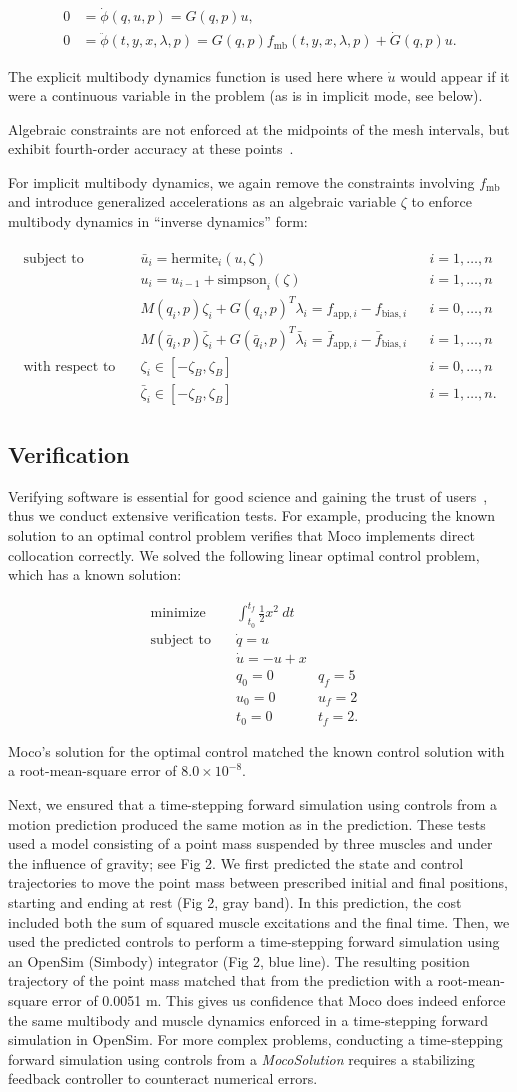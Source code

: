 \documentclass[10pt,letterpaper]{article}
\newcommand{\hermitesimpsonkincon}{
    \begin{align}
         0 &= \dot{\phi}(q, u, p) = G(q, p) u,\\
         0 &= \ddot{\phi}(t, y, x, \lambda, p) = G(q, p) f_{\textrm{mb}}(t, y, x, \lambda, p) + \dot{G}(q, p) u.
    \end{align}
}
\newcommand{\hermitesimpsonimplicit}{
\begin{align}
    \begin{aligned}
    \mbox{subject to} \quad
         & \bar{u}_i = \textrm{hermite}_i(u, \zeta) && i = 1, \ldots, n \\
         & u_i = u_{i-1} + \textrm{simpson}_i(\zeta)  && i = 1, \ldots, n \\
         & M(q_i, p)\zeta_i + G(q_i, p)^T \lambda_i =
          f_{\textrm{app},i} -
            f_{\textrm{bias},i} && i = 0, \ldots, n \\
         & M(\bar{q}_i, p)\bar{\zeta}_i + G(\bar{q}_i, p)^T \bar{\lambda}_i =
          \bar{f}_{\textrm{app},i} -
            \bar{f}_{\textrm{bias},i} && i = 1, \ldots, n \\
    \mbox{with respect to} \quad
         & \zeta_i \in [-\zeta_{B}, \zeta_{B}] && i = 0, \ldots, n \\
         & \bar{\zeta}_i \in [-\zeta_{B}, \zeta_{B}] && i = 1, \ldots, n.
    \end{aligned}
\end{align}
}
\newcommand{\analytic}{
\begin{equation}
    \begin{aligned}
        \mbox{minimize}
         \quad & \int_{t_0}^{t_f} \frac{1}{2}x^2~dt &&  \\
         \mbox{subject to}
         \quad & \dot{q} = u \\
         & \dot{u} = -u + x \\
         & q_0 = 0 & q_f = 5 \\
         & u_0 = 0 & u_f = 2\\
         & t_0 = 0 & t_f = 2.
    \end{aligned}
\end{equation}
}
\begin{document}
\hermitesimpsonkincon

The explicit multibody dynamics function is used here where $ \dot{u} $ would appear if it were a continuous variable in the problem (as is in implicit mode, see below).

Algebraic constraints are not enforced at the midpoints of the mesh intervals, but exhibit fourth-order accuracy at these points~\cite{Posa:2016}.

For implicit multibody dynamics, we again remove the constraints involving $f_\mathrm{mb}$ and introduce generalized accelerations as an algebraic variable $\zeta$ to enforce multibody dynamics in “inverse dynamics” form:

\hermitesimpsonimplicit

\subsection*{Verification}

Verifying software is essential for good science and gaining the trust of users~\cite{Hicks:2015bo}, thus we conduct extensive verification tests. For example, producing the known solution to an optimal control problem verifies that Moco implements direct collocation correctly. We solved the following linear optimal control problem, which has a known solution:

\analytic

Moco’s solution for the optimal control matched the known control solution with a root-mean-square error of $8.0 \times 10^{-8}$.

Next, we ensured that a time-stepping forward simulation using controls from a motion prediction produced the same motion as in the prediction. These tests used a model consisting of a point mass suspended by three muscles and under the influence of gravity; see Fig 2. We first predicted the state and control trajectories to move the point mass between prescribed initial and final positions, starting and ending at rest (Fig 2, gray band). In this prediction, the cost included both the sum of squared muscle excitations and the final time. Then, we used the predicted controls to perform a time-stepping forward simulation using an OpenSim (Simbody) integrator (Fig 2, blue line). The resulting position trajectory of the point mass matched that from the prediction with a root-mean-square error of 0.0051 m. This gives us confidence that Moco does indeed enforce the same multibody and muscle dynamics enforced in a time-stepping forward simulation in OpenSim. For more complex problems, conducting a time-stepping forward simulation using controls from a \textit{MocoSolution} requires a stabilizing feedback controller to counteract numerical errors.
\end{document}
